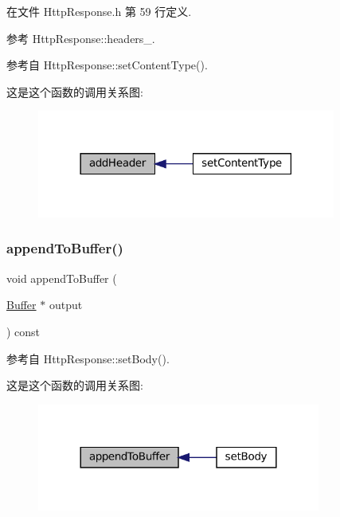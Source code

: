 在文件 Http\+Response.\+h 第 59 行定义.



参考 Http\+Response\+::headers\+\_\+.



参考自 Http\+Response\+::set\+Content\+Type().

这是这个函数的调用关系图\+:
\nopagebreak
\begin{figure}[H]
\begin{center}
\leavevmode
\includegraphics[width=278pt]{classmuduo_1_1net_1_1HttpResponse_a999431a881eda9ce08a1077445f0da57_icgraph}
\end{center}
\end{figure}
\mbox{\label{classmuduo_1_1net_1_1HttpResponse_ad653b5453eec08dd28444d57bfc2b94b}} 
\subsubsection{\texorpdfstring{append\+To\+Buffer()}{appendToBuffer()}}
{\footnotesize\ttfamily void append\+To\+Buffer (\begin{DoxyParamCaption}\item[{\hyperlink{classmuduo_1_1net_1_1Buffer}{Buffer} $\ast$}]{output }\end{DoxyParamCaption}) const}



参考自 Http\+Response\+::set\+Body().

这是这个函数的调用关系图\+:
\nopagebreak
\begin{figure}[H]
\begin{center}
\leavevmode
\includegraphics[width=264pt]{classmuduo_1_1net_1_1HttpResponse_ad653b5453eec08dd28444d57bfc2b94b_icgraph}
\end{center}
\end{figure}
\mbox{\label{classmuduo_1_1net_1_1HttpResponse_ab8fae68a967e14c3eb49839bb7e37e8c}} 
